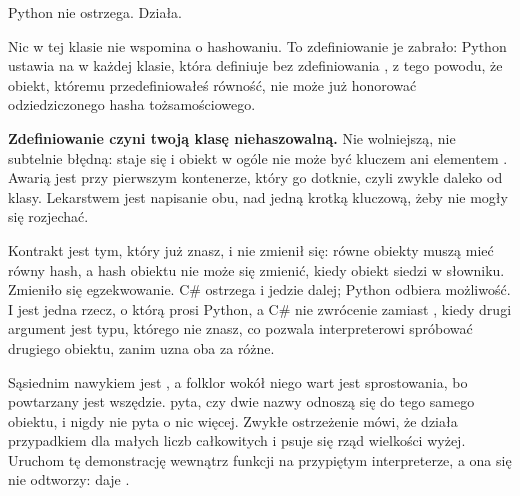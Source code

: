 Python nie ostrzega. Działa.


\noindent
Nic w tej klasie nie wspomina o hashowaniu. To zdefiniowanie
 je zabrało: Python ustawia  na
 w każdej klasie, która definiuje  bez
zdefiniowania , z tego powodu, że obiekt, któremu
przedefiniowałeś równość, nie może już honorować odziedziczonego hasha
tożsamościowego.



\begin{trapbox}
\textbf{Zdefiniowanie  czyni twoją klasę
niehaszowalną.} Nie wolniejszą, nie subtelnie błędną:
 staje się  i obiekt w ogóle nie może być
kluczem  ani elementem . Awarią jest
 przy pierwszym kontenerze, który go dotknie, czyli
zwykle daleko od klasy. Lekarstwem jest napisanie obu, nad jedną krotką
kluczową, żeby nie mogły się rozjechać.
\end{trapbox}


\begin{csbox}
Kontrakt jest tym, który już znasz, i nie zmienił się: równe obiekty muszą
mieć równy hash, a hash obiektu nie może się zmienić, kiedy obiekt siedzi
w słowniku. Zmieniło się egzekwowanie. C\# ostrzega i jedzie dalej; Python
odbiera możliwość. I jest jedna rzecz, o którą prosi Python, a C\# nie
\dash{} zwrócenie  zamiast , kiedy drugi
argument jest typu, którego nie znasz, co pozwala interpreterowi spróbować
 drugiego obiektu, zanim uzna oba za różne.
\end{csbox}

\noindent
{}
Sąsiednim nawykiem jest , a folklor wokół niego wart jest
sprostowania, bo powtarzany jest wszędzie.  pyta, czy dwie nazwy
odnoszą się do tego samego obiektu, i nigdy nie pyta o nic więcej. Zwykłe
ostrzeżenie mówi, że działa przypadkiem dla małych liczb całkowitych i
psuje się rząd wielkości wyżej. Uruchom tę demonstrację wewnątrz funkcji
na przypiętym interpreterze, a ona się nie odtworzy:  daje .

